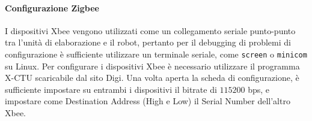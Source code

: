 \paragraph{Configurazione Zigbee} I dispositivi Xbee vengono utilizzati come un collegamento seriale punto-punto tra l'unità di elaborazione e il robot, pertanto per il debugging di problemi di configurazione è sufficiente utilizzare un terminale seriale, come \verb|screen| o \verb|minicom| su Linux. Per configurare i dispositivi Xbee è necessario utilizzare il programma X-CTU scaricabile dal sito Digi. Una volta aperta la scheda di configurazione, è sufficiente impostare su entrambi i dispositivi il bitrate di $115200$ bps, e impostare come Destination Address (High e Low) il Serial Number dell'altro Xbee.
